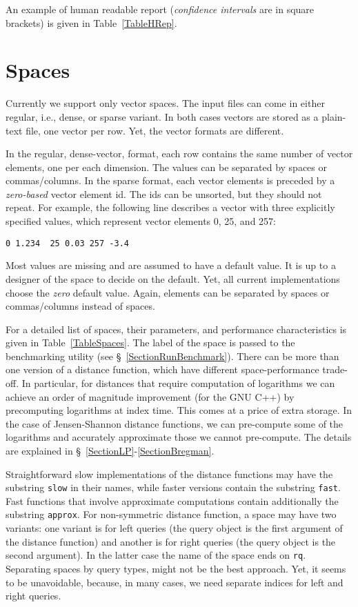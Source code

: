 \documentclass[runningheads,a4paper]{llncs}
\newcommand{\ttt}[1]{\texttt{#1}}
\begin{document}
An example of human readable report (\emph{confidence intervals} are in square brackets)
is given in Table~\ref{TableHRep}.

\section{Spaces}\label{SectionSpaces}
Currently we support only vector spaces.
The input files can come in either regular, i.e., dense,
or sparse variant. 
In both cases vectors are stored
as a plain-text file, one vector per row.
Yet, the vector formats are different.

In the regular, dense-vector, format, each row
contains the same number of vector elements, one per each dimension.
The values can be separated by spaces or commas/columns.
In the sparse format, each vector elements is preceded
by a \emph{zero-based} vector element id. 
The ids can be unsorted, but they should not repeat.
For example, the following line
describes a vector with three explicitly specified values,
which represent vector elements 0, 25, and 257:
\begin{verbatim}
0 1.234  25 0.03 257 -3.4 
\end{verbatim}

Most values are missing and are assumed to have a default value.
It is up to a designer of the space to decide on the default.
Yet, all current implementations choose the \emph{zero} default value.
Again, elements can be separated by spaces or commas/columns instead of spaces.

For a detailed list of spaces, their parameters, 
and performance characteristics is given in Table~\ref{TableSpaces}.
The label of the space is passed to the benchmarking utility (see \S~\ref{SectionRunBenchmark}).
There can be more than one version of a distance function,
which have different space-performance trade-off.
In particular, for distances that require computation of logarithms 
we can achieve an order of magnitude improvement (for the GNU C++) by precomputing
logarithms at index time. This comes at a price of extra storage. 
In the case of Jensen-Shannon distance functions, we can pre-compute some 
of the logarithms and accurately approximate those we cannot pre-compute.
The details are explained in \S~\ref{SectionLP}-\ref{SectionBregman}.

Straightforward slow implementations of the distance functions may have the substring \ttt{slow}
in their names, while faster versions contain the substring \ttt{fast}.
Fast functions that involve approximate computations contain additionally the substring \ttt{approx}.
For non-symmetric distance function, a space may have two variants: one variant is for left
queries (the query object is the first argument of the distance function) 
and another is for right queries (the query object is the second argument).
In the latter case the name of the space ends on \texttt{rq}.
Separating spaces by query types, might not be the best approach.
Yet, it seems to be unavoidable, because, in many cases,
we need separate indices for left and right queries.
\end{document}

